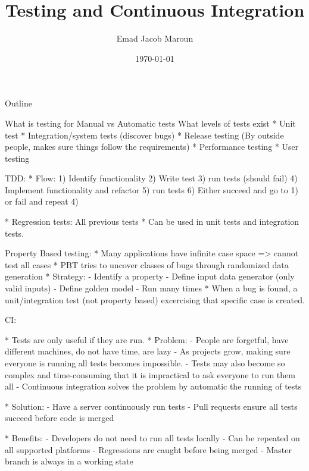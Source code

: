 

\newif\ifbook


\title{Testing and Continuous Integration}
\author{Emad Jacob Maroun}
\date{\today}



\begin{frame}
\titlepage
\end{frame}

\begin{frame}[fragile]{Outline}
\begin{itemize}
	 
	What is testing for
	Manual vs Automatic tests
	What levels of tests exist
		* Unit test
		* Integration/system tests (discover bugs)
		* Release testing (By outside people, makes sure things follow the requirements)
		* Performance testing
		* User testing
		
	TDD:
		* Flow: 1) Identify functionality
				2) Write test
				3) run tests (should fail)
				4) Implement functionality and refactor
				5) run tests
				6) Either succeed and go to 1) or fail and repeat 4)
				
		* Regression tests: All previous tests
		* Can be used in unit tests and integration tests.
		
	Property Based testing:
		* Many applications have infinite case space => cannot test all cases
		* PBT tries to uncover classes of bugs through randomized data generation
		* Strategy:
			- Identify a property
			- Define input data generator (only valid inputs)
			- Define golden model
			- Run many times
		* When a bug is found, a unit/integration test (not property based) excercising that specific case is created.
	
	CI:
	
		* Tests are only useful if they are run.
		* Problem: 
			- People are forgetful, have different machines, do not have time, are lazy
			- As projects grow, making sure everyone is running all tests becomes impossible.
			- Tests may also become so complex and time-consuming that it is impractical to ask everyone to run them all
			- Continuous integration solves the problem by automatic the running of tests
			
		* Solution:
			- Have a server continuously run tests
			- Pull requests ensure all tests succeed before code is merged
		
		* Benefits:
			- Developers do not need to run all tests locally
			- Can be repeated on all supported platforms
			- Regressions are caught before being merged
			- Master branch is always in a working state
			

\end{itemize}
\end{frame}
